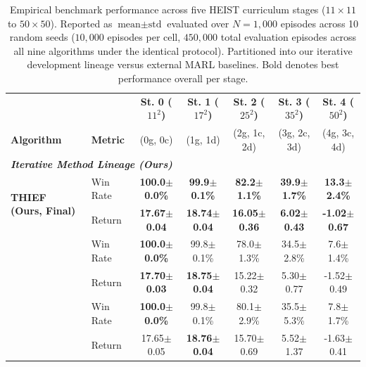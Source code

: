 \begin{table}[htbp]
\centering
\caption{Empirical benchmark performance across five HEIST curriculum stages ($11\times 11$ to $50\times 50$). Reported as $\text{mean} \pm \text{std}$ evaluated over $N=1,\!000$ episodes across 10 random seeds ($10,\!000$ episodes per cell, $450,\!000$ total evaluation episodes across all nine algorithms under the identical protocol). Partitioned into our iterative development lineage versus external MARL baselines. Bold denotes best performance overall per stage.}
\label{tab:main_results}
\vspace{0.04in}
\footnotesize
\setlength{\tabcolsep}{2.8pt}
\renewcommand{\arraystretch}{1.06}
\begin{tabular}{ll ccccc}
\toprule
 & & \textbf{St. 0 ($11^2$)} & \textbf{St. 1 ($17^2$)} & \textbf{St. 2 ($25^2$)} & \textbf{St. 3 ($35^2$)} & \textbf{St. 4 ($50^2$)} \\
\textbf{Algorithm} & \textbf{Metric} & (0g, 0c) & (1g, 1d) & (2g, 1c, 2d) & (3g, 2c, 3d) & (4g, 3c, 4d) \\
\midrule
\multicolumn{7}{l}{\textit{\textbf{Iterative Method Lineage (Ours)}}} \\
\midrule
\multirow{2}{*}{\textbf{THIEF (Ours, Final)}} & Win Rate & \textbf{100.0\scriptsize$\pm$0.0\%} & \textbf{99.9\scriptsize$\pm$0.1\%} & \textbf{82.2\scriptsize$\pm$1.1\%} & \textbf{39.9\scriptsize$\pm$1.7\%} & \textbf{13.3\scriptsize$\pm$2.4\%} \\
 & Return & \textbf{17.67\scriptsize$\pm$0.04} & \textbf{18.74\scriptsize$\pm$0.04} & \textbf{16.05\scriptsize$\pm$0.36} & \textbf{6.02\scriptsize$\pm$0.43} & \textbf{-1.02\scriptsize$\pm$0.67} \\
\addlinespace[2pt]
\multirow{2}{*}{E-COOP (Iter 3)} & Win Rate & \textbf{100.0\scriptsize$\pm$0.0\%} & 99.8\scriptsize$\pm$0.1\% & 78.0\scriptsize$\pm$1.3\% & 34.5\scriptsize$\pm$2.8\% & 7.6\scriptsize$\pm$1.4\% \\
 & Return & \textbf{17.70\scriptsize$\pm$0.03} & \textbf{18.75\scriptsize$\pm$0.04} & 15.22\scriptsize$\pm$0.32 & 5.30\scriptsize$\pm$0.77 & -1.52\scriptsize$\pm$0.49 \\
\addlinespace[2pt]
\multirow{2}{*}{COOP (Iter 2)} & Win Rate & \textbf{100.0\scriptsize$\pm$0.0\%} & 99.8\scriptsize$\pm$0.1\% & 80.1\scriptsize$\pm$2.9\% & 35.5\scriptsize$\pm$5.3\% & 7.8\scriptsize$\pm$1.7\% \\
 & Return & 17.65\scriptsize$\pm$0.05 & \textbf{18.76\scriptsize$\pm$0.04} & 15.70\scriptsize$\pm$0.69 & 5.52\scriptsize$\pm$1.37 & -1.63\scriptsize$\pm$0.41 \\

\end{tabular}
\end{table}
